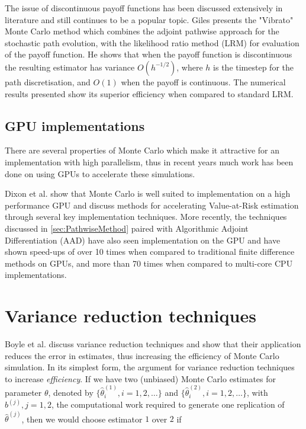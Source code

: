 The issue of discontinuous payoff functions has been discussed extensively in literature and still continues to be a popular topic. Giles presents the "Vibrato" Monte Carlo method \cite{giles2009vibrato} which combines the adjoint pathwise approach for the stochastic path evolution, with the likelihood ratio method (LRM) for evaluation of the payoff function. He shows that when the payoff function is discontinuous the resulting estimator has variance $O(h^{-1/2})$, where $h$ is the timestep for the path discretisation, and $O(1)$ when the payoff is continuous. The numerical results presented show its superior efficiency when compared to standard LRM.

\subsection{GPU implementations}
There are several properties of Monte Carlo which make it attractive for an implementation with high parallelism, thus in recent years much work has been done on using GPUs to accelerate these simulations.

Dixon et al. \cite{dixon2012monte} show that Monte Carlo is well suited to implementation on a high performance GPU and discuss methods for accelerating Value-at-Risk estimation through several key implementation techniques. More recently, the techniques discussed in \ref{sec:PathwiseMethod} paired with Algorithmic Adjoint Differentiation (AAD) have also seen implementation on the GPU \cite{savickas2014super} and have shown speed-ups of over 10 times when compared to traditional finite difference methods on GPUs, and more than 70 times when compared to multi-core CPU implementations.

\section{Variance reduction techniques}
Boyle et al. \cite{boyle1997monte} discuss variance reduction techniques and show that their application reduces the error in estimates, thus increasing the efficiency of Monte Carlo simulation. In its simplest form, the argument for variance reduction techniques to increase \textit{efficiency}. If we have two (unbiased) Monte Carlo estimates for parameter $\theta$, denoted by $\{ \hat{\theta}_i^{(1)}, i = 1, 2, \dots \}$ and $\{ \hat{\theta}_i^{(2)}, i = 1, 2, \dots \}$, with $b^{(j)}, j = 1, 2$, the computational work required to generate one replication of $\hat{\theta}^{(j)}$, then we would choose estimator $1$ over $2$ if

